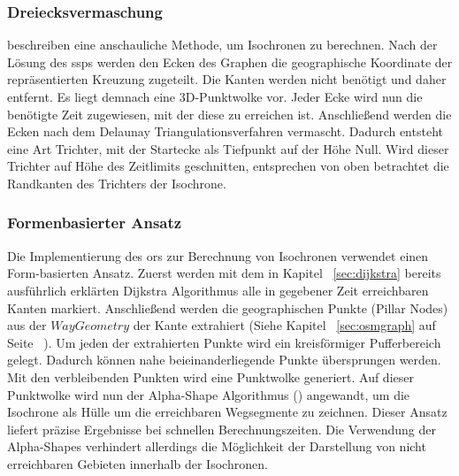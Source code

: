 \subsubsection{Dreiecksvermaschung}
\cite{isochrones} beschreiben eine anschauliche Methode, um Isochronen zu berechnen.
Nach der Lösung des \gls{ssp}s werden den Ecken des Graphen die geographische Koordinate der repräsentierten Kreuzung zugeteilt.
Die Kanten werden nicht benötigt und daher entfernt.
Es liegt demnach eine 3D-Punktwolke vor.
Jeder Ecke wird nun die benötigte Zeit zugewiesen, mit der diese zu erreichen ist.
Anschließend werden die Ecken nach dem Delaunay Triangulationsverfahren vermascht.
Dadurch entsteht eine Art Trichter, mit der Startecke als Tiefpunkt auf der Höhe Null.
Wird dieser Trichter auf Höhe des Zeitlimits geschnitten, entsprechen von oben betrachtet die Randkanten des Trichters der Isochrone.


\subsubsection{Formenbasierter Ansatz}
\label{sec:form}
Die Implementierung des \gls{ors} zur Berechnung von Isochronen verwendet einen Form-basierten Ansatz.
Zuerst werden mit dem in Kapitel ~\ref{sec:dijkstra} bereits ausführlich erklärten Dijkstra Algorithmus alle in gegebener Zeit erreichbaren Kanten markiert.
Anschließend werden die geographischen Punkte (Pillar Nodes) aus der $WayGeometry$ der Kante extrahiert (Siehe Kapitel ~\ref{sec:osmgraph} auf Seite ~\pageref{sec:osmgraph}).
Um jeden der extrahierten Punkte wird ein kreisförmiger Pufferbereich gelegt.
Dadurch können nahe beieinanderliegende Punkte übersprungen werden.
Mit den verbleibenden Punkten wird eine Punktwolke generiert.
Auf dieser Punktwolke wird nun der Alpha-Shape Algorithmus (\cite{akkiraju1995alpha}) angewandt, um die Isochrone als Hülle um die erreichbaren Wegsegmente zu zeichnen.
Dieser Ansatz liefert präzise Ergebnisse bei schnellen Berechnungszeiten.
Die Verwendung der Alpha-Shapes verhindert allerdings die Möglichkeit der Darstellung von nicht erreichbaren Gebieten innerhalb der Isochronen.
